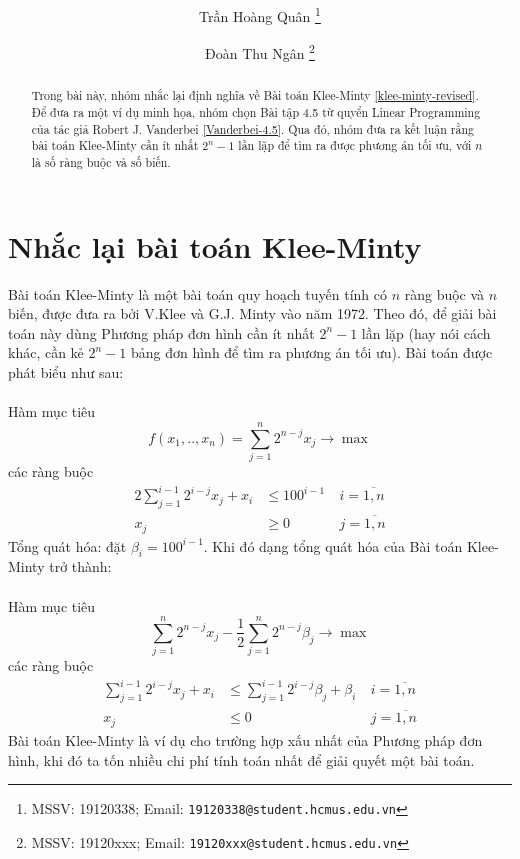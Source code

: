 \documentclass[12pt]{article}
\title{\textbf{\reportname}}
\author{Trần Hoàng Quân%
  \thanks{MSSV: 19120338; Email: \texttt{19120338@student.hcmus.edu.vn}}}
\affil{Trường Đại học Khoa học Tự nhiên, ĐHQG-HCM}
\author{Đoàn Thu Ngân%
  \thanks{MSSV: 19120xxx; Email: \texttt{19120xxx@student.hcmus.edu.vn}}}
\affil{Trường Đại học Khoa học Tự nhiên, ĐHQG-HCM}
\begin{document}
\maketitle

\begin{abstract}
Trong bài này, nhóm nhắc lại định nghĩa về Bài toán Klee-Minty \ref{klee-minty-revised}. Để đưa ra một ví dụ minh họa, nhóm chọn Bài tập 4.5 từ quyển Linear Programming của tác giả Robert J. Vanderbei \ref{Vanderbei-4.5}. Qua đó, nhóm đưa ra kết luận rằng bài toán Klee-Minty cần ít nhất $2^n - 1$ lần lặp để tìm ra được phương án tối ưu, với $n$ là số ràng buộc và số biến.
\end{abstract}

\section{Nhắc lại bài toán Klee-Minty}\label{klee-minty-revised}
Bài toán Klee-Minty là một bài toán quy hoạch tuyến tính có $n$ ràng buộc và $n$ biến, được đưa ra bởi V.Klee và G.J. Minty vào năm 1972\cite{Vanderbei2020}. Theo đó, để giải bài toán này dùng Phương pháp đơn hình cần ít nhất $2^{n} - 1$ lần lặp (hay nói cách khác, cần kẻ $2^{n} - 1$ bảng đơn hình để tìm ra phương án tối ưu). Bài toán được phát biểu như sau:\\\\
Hàm mục tiêu
$$
f(x_1, .., x_n) = \sum_{j = 1}^n 2^{n - j}x_j \rightarrow \max
$$
các ràng buộc
\begin{equation*}
\begin{aligned}
2\sum_{j = 1}^{i - 1} 2^{i - j}x_j + x_i &\leq 100^{i - 1}\ &i = \overline{1, n}\\
x_j &\geq 0\ &j = \overline{1, n}
\end{aligned}
\end{equation*}
Tổng quát hóa: đặt $\beta_i = 100^{i - 1}$. Khi đó dạng tổng quát hóa của Bài toán Klee-Minty trở thành:\\\\
Hàm mục tiêu
$$
\sum_{j = 1}^n 2^{n - j}x_j - \frac{1}{2}\sum_{j = 1}^{n} 2^{n - j}\beta_j \rightarrow \max
$$
các ràng buộc
\begin{equation*}
\begin{aligned}
\sum_{j = 1}^{i - 1} 2^{i - j} x_j + x_i &\leq \sum_{j = 1}^{i - 1} 2^{i - j} \beta_j + \beta_i\ &i = \overline{1, n}\\
x_j &\leq 0\ &j = \overline{1, n}
\end{aligned}
\end{equation*}
Bài toán Klee-Minty là ví dụ cho trường hợp xấu nhất của Phương pháp đơn hình, khi đó ta tốn nhiều chi phí tính toán nhất để giải quyết một bài toán.
\end{document}
